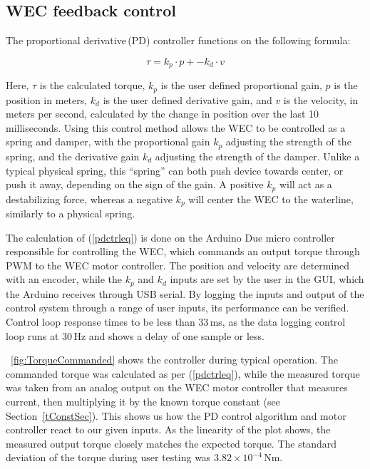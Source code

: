 \documentclass[11pt, letterpaper]{article}
\begin{document}
\subsection{WEC feedback control}
The proportional derivative\,(PD) controller functions on the following formula:

\begin{equation}  \label{pdctrleq}
  \tau = k_p \cdot p + -k_d \cdot v
\end{equation}

Here, $\tau$ is the calculated torque, $k_p$ is the user defined proportional gain, $p$ is the position in meters, $k_d$ is the user defined derivative gain, and $v$ is the velocity, in meters per second, calculated by the change in position over the last 10 milliseconds. 
Using this control method allows the WEC to be controlled as a spring and damper, with the proportional gain $k_p$ adjusting the strength of the spring, and the derivative gain $k_d$ adjusting the strength of the damper.
Unlike a typical physical spring, this ``spring'' can both push device towards center, or push it away, depending on the sign of the gain.
A positive $k_p$ will act as a destabilizing force, whereas a negative $k_p$ will center the WEC to the waterline, similarly to a physical spring.

The calculation of (\ref{pdctrleq}) is done on the Arduino Due micro controller responsible for controlling the WEC, which commands an output torque through PWM to the WEC motor controller.
The position and velocity are determined with an encoder, while the $k_p$ and $k_d$ inputs are set by the user in the GUI, which the Arduino receives through USB serial.
By logging the inputs and output of the control system through a range of user inputs, its performance can be verified.
Control loop response times to be less than 33\,ms, as the data logging control loop runs at 30\,Hz and shows a delay of one sample or less.

\figurename~\ref{fig:TorqueCommanded} shows the controller during typical operation. 
The commanded torque was calculated as per (\ref{pdctrleq}), while the measured torque was taken from an analog output on the WEC motor controller that measures current, then multiplying it by the known torque constant (see Section~\ref{tConstSec}).
This shows us how the PD control algorithm and motor controller react to our given inputs.
As the linearity of the plot shows, the measured output torque closely matches the expected torque.
The standard deviation of the torque during user testing was $3.82 \times 10^{-4}$\,Nm.
\end{document}
